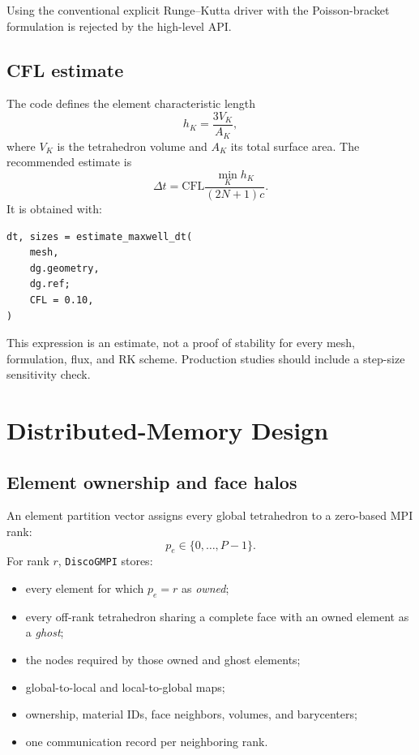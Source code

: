\documentclass[11pt,oneside]{book}
\newcommand{\pkg}{\texttt{DiscoGMPI}}
\begin{document}
Using the conventional explicit Runge--Kutta driver with the Poisson-bracket
formulation is rejected by the high-level API.

\section{CFL estimate}

The code defines the element characteristic length
\begin{equation}
  h_K = \frac{3V_K}{A_K},
\end{equation}
where $V_K$ is the tetrahedron volume and $A_K$ its total surface area. The
recommended estimate is
\begin{equation}
  \Delta t
  =
  \mathrm{CFL}
  \frac{\min_K h_K}{(2N+1)c}.
\end{equation}
It is obtained with:

\begin{lstlisting}
dt, sizes = estimate_maxwell_dt(
    mesh,
    dg.geometry,
    dg.ref;
    CFL = 0.10,
)
\end{lstlisting}

This expression is an estimate, not a proof of stability for every mesh,
formulation, flux, and RK scheme. Production studies should include a
step-size sensitivity check.

\chapter{Distributed-Memory Design}

\section{Element ownership and face halos}

An element partition vector assigns every global tetrahedron to a zero-based
MPI rank:
\begin{equation}
  p_e\in\{0,\ldots,P-1\}.
\end{equation}
For rank $r$, \pkg{} stores:

\begin{itemize}[leftmargin=*]
  \item every element for which $p_e=r$ as \emph{owned};
  \item every off-rank tetrahedron sharing a complete face with an owned
        element as a \emph{ghost};
  \item the nodes required by those owned and ghost elements;
  \item global-to-local and local-to-global maps;
  \item ownership, material IDs, face neighbors, volumes, and barycenters;
  \item one communication record per neighboring rank.
\end{itemize}
\end{document}
